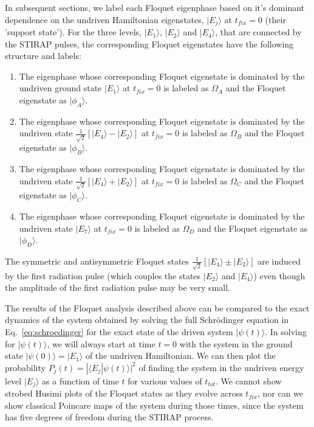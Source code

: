 In subsequent sections, we label each Floquet eigenphase based on it's dominant dependence on the undriven Hamiltonian eigenstates, $|E_j{\rangle}$  at $t_{fix}=0$ (their 'support state'). For the three levels, $|E_1{\rangle}$,  $|E_2{\rangle}$ and $|E_4{\rangle}$,  that are connected by the STIRAP pulses, the corresponding Floquet eigenstates have the following structure and labels:
%
\begin{enumerate}
\item 
The eigenphase whose corresponding Floquet eigenstate is dominated by the undriven ground state $|E_1{\rangle}$  at $t_{fix}=0$ is labeled as $\Omega_A$ and the Floquet eigenstate as $|\phi_A\rangle$.

\item
The eigenphase whose corresponding Floquet eigenstate is dominated by the undriven state $\frac{1}{\sqrt{2}}\left[|E_4\rangle - |E_2\rangle \right]$ at $t_{fix}=0$ is labeled as $\Omega_B$ and the Floquet eigenstate as $|\phi_B\rangle$.

\item
The eigenphase whose corresponding Floquet eigenstate is dominated by the undriven state $\frac{1}{\sqrt{2}}\left[|E_4\rangle + |E_2\rangle \right]$ at $t_{fix}=0$  is labeled as $\Omega_C$ and the Floquet eigenstate as $|\phi_C\rangle$.

\item
The eigenphase whose corresponding Floquet eigenstate is dominated by the undriven  state $|E_7{\rangle}$  at $t_{fix}=0$ is labeled as $\Omega_D$ and the Floquet eigenstate as $|\phi_D\rangle$.

\end{enumerate}
%
The symmetric and antisymmetric Floquet states  $\frac{1}{\sqrt{2}}\left[|E_4\rangle {\pm} |E_2\rangle \right]$  are induced by the first radiation pulse (which couples the states $|E_2{\rangle}$ and $|E_4{\rangle}$) even though the amplitude of the first radiation pulse may be very small. 

The results of the Floquet analysis described above can be compared to the  exact dynamics of the system obtained  by solving the full Schr\"odinger equation in Eq.~\eqref{eq:schroedinger} for the exact state of the driven system $|{\psi}(t){\rangle}$.  In solving for $|{\psi}(t){\rangle}$,  we will always start at time $t=0$ with the system in the  ground state $|{\psi}(0){\rangle}=|E_1{\rangle}$  of the undriven Hamiltonian.   We can  then  plot the probability $P_j(t)=|\langle E_j|\psi(t) \rangle|^2$ of finding the system in the undriven energy level $|E_j \rangle$ as a function of time $t$ for various values of $t_{tot}$.
We cannot show strobed Husimi plots of the Floquet states as they evolve across $t_{fix}$, nor can we show classical Poincare maps of the system during those times, since the system has five degrees of freedom during the STIRAP process.

